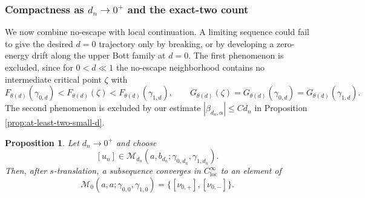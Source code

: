\documentclass[11pt]{amsart}
\theoremstyle{plain}
\newtheorem{prop}[thm]{Proposition}
\theoremstyle{definition}
\begin{document}
\subsubsection{Compactness as $d_n\to 0^+$ and the exact-two count}

We now combine no-escape with local continuation. A limiting sequence could
fail to give the desired $d=0$ trajectory only by breaking, or by developing
a zero-energy drift along the upper Bott family at $d=0$. The first
phenomenon is excluded, since %
for $0<d\ll1$ the no-escape neighborhood contains no intermediate critical
point $\zeta$ with
\[
F_{\theta(d)}(\gamma_{0,d})< F_{\theta(d)}(\zeta)
< F_{\theta(d)}(\gamma_{1,d}),\qquad
G_{\theta(d)}(\zeta)=G_{\theta(d)}(\gamma_{0,d})
=G_{\theta(d)}(\gamma_{1,d}).
\]
The second phenomenon is excluded by our estimate $|\beta_{d_n,\alpha}|\leq Cd_n$ in Proposition \ref{prop:at-least-two-small-d}.


\begin{prop}\label{prop:compactness-dn-to-0}
Let $d_n\to 0^+$ and choose
\[
[u_n]\in \mathcal{M}_{d_n}(a,b_{d_n};\gamma_{0,d_n},\gamma_{1,d_n}).
\]
Then, after $s$-translation, a subsequence converges in $C^\infty_{\mathrm{loc}}$ to an element of
\[
\mathcal{M}_0(a,a;\gamma_{0,0},\gamma_{1,0})=
\{[\nu_{0,+}],[\nu_{0,-}]\}.
\]
\end{prop}
\end{document}
